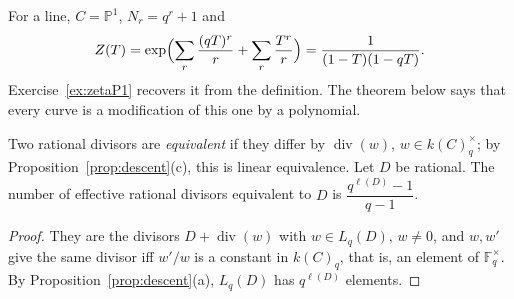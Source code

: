 For a line, $C=\mathbb P^1$, $N_r=q^r+1$ and
\[
Z(T)=\exp\Bigl(\sum_r\frac{(qT)^r}r+\sum_r\frac{T^r}r\Bigr)=\frac1{(1-T)(1-qT)}.
\]
Exercise~\ref{ex:zetaP1} recovers it from the definition. The theorem below says that every curve is a modification of this one by a polynomial.

\begin{lemma}\label{lem:classcount}
Two rational divisors are \emph{equivalent} if they differ by $\operatorname{div}(w)$, $w\in k(C)_q^\times$; by Proposition~\ref{prop:descent}(c), this is linear
equivalence. Let $D$ be rational. The number of effective rational divisors equivalent to $D$ is $\dfrac{q^{\ell(D)}-1}{q-1}$.
\end{lemma}
\begin{proof}
They are the divisors $D+\operatorname{div}(w)$ with $w\in L_q(D)$, $w\ne0$, and $w,w'$ give the same divisor iff $w'/w$ is a constant in $k(C)_q$, that is, an
element of $\mathbb F_q^\times$. By Proposition~\ref{prop:descent}(a), $L_q(D)$ has $q^{\ell(D)}$ elements.
\end{proof}

